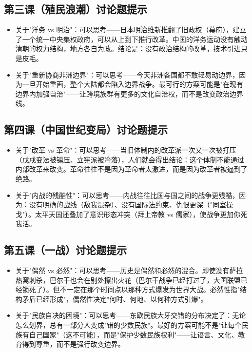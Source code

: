 \documentclass[a4paper,12pt]{ctexart}
\begin{document}
\subsection*{第三课（殖民浪潮）讨论题提示}
\begin{itemize}
  \item 关于"洋务 vs 明治"：可以思考——日本明治维新推翻了旧政权（幕府），建立了一个统一中央集权政府，可以从上到下推行改革。中国的洋务运动没有触动清朝的权力结构，地方各自为政。结论是：没有政治结构的改革，技术引进只是皮毛。
  \item 关于"重新协商非洲边界"：可以思考——今天非洲各国都不敢轻易动边界，因为一旦开始重画，整个大陆都会陷入边界战争。最可行的方案可能是"在现有边界内加强自治"——让跨境族群有更多的文化自治权，而不是改变政治边界线。
\end{itemize}

\subsection*{第四课（中国世纪变局）讨论题提示}
\begin{itemize}
  \item 关于"改革 vs 革命"：可以思考——当旧体制内的改革派一次又一次被打压（戊戌变法被镇压、立宪派被冷落），人们就会得出结论：这个体制不能通过内部改革来改变。革命往往不是因为革命者太激进，而是因为改革者被逼到了绝路。
  \item 关于"内战的残酷性"：可以思考——内战往往比国与国之间的战争更残酷，因为：没有明确的战线（敌我混杂）、没有国际法约束、仇恨更深（"同室操戈"）。太平天国还叠加了意识形态冲突（拜上帝教 vs 儒家），使战争更加你死我活。
\end{itemize}

\subsection*{第五课（一战）讨论题提示}
\begin{itemize}
  \item 关于"偶然 vs 必然"：可以思考——历史是偶然和必然的混合。即使没有萨拉热窝刺杀，巴尔干也会在别处擦出火花（巴尔干战争已经打过了，大国联盟已经锁死了）。但不一定在那个时间点以那种方式爆发为世界大战。必然性指"结构矛盾已经形成"，偶然性决定"何时、何地、以何种方式引爆"。
  \item 关于"民族自决的困境"：可以思考——东欧民族大牙交错的分布决定了：无论怎么划界，总有一部分人变成"错的少数民族"。最好的方案可能不是"让每个民族有自己国家"（这不可能），而是"保护少数民族权利"——让语言、文化、教育得到尊重，而不是强行改变边界。
\end{itemize}
\end{document}
